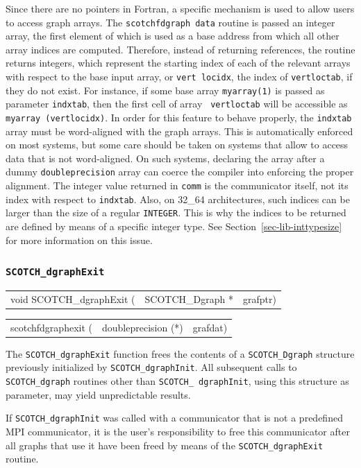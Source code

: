 \begin{itemize}
Since there are no pointers in Fortran, a specific mechanism is used
to allow users to access graph arrays. The {\tt scotchf\lbt dgraph\lbt
data} routine is passed an integer array, the first element of which
is used as a base address from which all other array indices are
computed. Therefore, instead of returning references, the routine
returns integers, which represent the starting index of each of the
relevant arrays with respect to the base input array, or {\tt vert\lbt
loc\lbt idx}, the index of {\tt vert\lbt loc\lbt tab}, if they do not
exist. For instance, if some base array {\tt myarray\lbt (1)} is
passed as parameter {\tt indxtab}, then the first cell of array {\tt
vert\lbt loc\lbt tab} will be accessible as {\tt myarray\lbt
(vert\lbt loc\lbt idx)}.
In order for this feature to behave properly, the {\tt indxtab}
array must be word-aligned with the graph arrays. This is
automatically enforced on most systems, but some care should be
taken on systems that allow to access data that is not
word-aligned. On such systems, declaring the array after a
dummy {\tt double\lbt precision} array can coerce the compiler
into enforcing the proper alignment. The integer value returned in
{\tt comm} is the communicator itself, not its index with respect to
{\tt indxtab}. Also, on 32\_64 architectures,
such indices can be larger than the size of a regular
{\tt INTEGER}. This is why the indices to be returned are defined by
means of a specific integer type. See
Section~\ref{sec-lib-inttypesize} for more information on this
issue.
\end{itemize}

\subsubsection{{\tt SCOTCH\_dgraphExit}}

\begin{itemize}
\progsyn

{\tt\begin{tabular}{l@{}ll}
void SCOTCH\_dgraphExit ( & SCOTCH\_Dgraph * & grafptr)
\end{tabular}}

{\tt\begin{tabular}{l@{}ll}
scotchfdgraphexit ( & doubleprecision (*) & grafdat)
\end{tabular}}

\progdes

The {\tt SCOTCH\_dgraphExit} function frees the contents of a
{\tt SCOTCH\_\lbt Dgraph} structure previously initialized by
{\tt SCOTCH\_\lbt dgraphInit}. All subsequent calls to
{\tt SCOTCH\_\lbt dgraph} routines other than {\tt SCOTCH\_\lbt
dgraphInit}, using this structure as parameter, may yield
unpredictable results.

If {\tt SCOTCH\_\lbt dgraph\lbt Init} was called with a
communicator that is not a predefined MPI communicator, it is
the user's responsibility to free this communicator after
all graphs that use it have been freed by means of the
{\tt SCOTCH\_\lbt dgraph\lbt Exit} routine.

\end{itemize}

